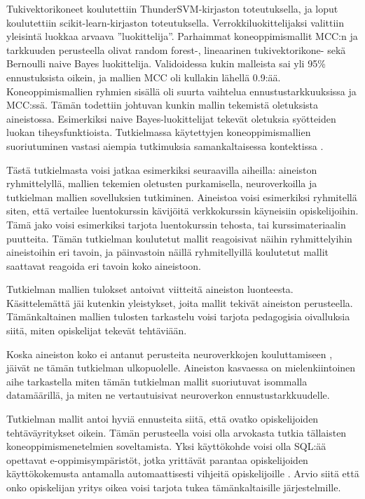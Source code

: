 \documentclass[finnish,twoside,openright]{HYgraduMLDS}
\begin{document}
Tukivektorikoneet koulutettiin ThunderSVM-kirjaston \cite{wenthundersvm18} toteutuksella, ja loput koulutettiin scikit-learn-kirjaston \cite{scikit-learn} toteutuksella. Verrokkiluokittelijaksi valittiin yleisintä luokkaa arvaava ''luokittelija''. Parhaimmat koneoppimismallit MCC:n ja tarkkuuden perusteella olivat random forest-, lineaarinen tukivektorikone- sekä Bernoulli naive Bayes luokittelija. Validoidessa kukin malleista sai yli 95\% ennustuksista oikein, ja mallien MCC oli kullakin lähellä 0.9:ää. Koneoppimismallien ryhmien sisällä oli suurta vaihtelua ennustustarkkuuksissa ja MCC:ssä. Tämän todettiin johtuvan kunkin mallin tekemistä oletuksista aineistossa. Esimerkiksi naive Bayes-luokittelijat tekevät oletuksia syötteiden luokan tiheysfunktioista. Tutkielmassa käytettyjen koneoppimismallien suoriutuminen vastasi aiempia tutkimuksia samankaltaisessa kontektissa \cite{hellas2018predicting, Ahadi:2015:EML:2787622.2787717, bergin2015using}.

Tästä tutkielmasta voisi jatkaa esimerkiksi seuraavilla aiheilla: aineiston ryhmittelyllä, mallien tekemien oletusten purkamisella, neuroverkoilla ja tutkielman mallien sovelluksien tutkiminen. Aineistoa voisi esimerkiksi ryhmitellä siten, että vertailee luentokurssin kävijöitä verkkokurssin käyneisiin opiskelijoihin. Tämä jako voisi esimerkiksi tarjota luentokurssin tehosta, tai kurssimateriaalin puutteita. Tämän tutkielman koulutetut mallit reagoisivat näihin ryhmittelyihin aineistoihin eri tavoin, ja päinvastoin näillä ryhmitellyillä koulutetut mallit saattavat reagoida eri tavoin koko aineistoon. 

Tutkielman mallien tulokset antoivat viitteitä aineiston luonteesta. Käsittelemättä jäi kutenkin yleistykset, joita mallit tekivät aineiston perusteella. Tämänkaltainen mallien tulosten tarkastelu voisi tarjota pedagogisia oivalluksia siitä, miten opiskelijat tekevät tehtäviään.

Koska aineiston koko ei antanut perusteita neuroverkkojen kouluttamiseen \cite{Castro-Wunsch:2017:ENN:3017680.3017792}, jäivät ne tämän tutkielman ulkopuolelle. Aineiston kasvaessa on mielenkiintoinen aihe tarkastella miten tämän tutkielman mallit suoriutuvat isommalla datamäärillä, ja miten ne vertautuisivat neuroverkon ennustustarkkuudelle.

Tutkielman mallit antoi hyviä ennusteita siitä, että ovatko opiskelijoiden tehtäväyritykset oikein. Tämän perusteella voisi olla arvokasta tutkia tällaisten koneoppimismenetelmien soveltamista. Yksi käyttökohde voisi olla SQL:ää opettavat e-oppimisympäristöt, jotka yrittävät parantaa opiskelijoiden käyttökokemusta antamalla automaattisesti vihjeitä opiskelijoille \cite{lavbivc2017recommender}. Arvio siitä että onko opiskelijan yritys oikea voisi tarjota tukea tämänkaltaisille järjestelmille.
\end{document}
